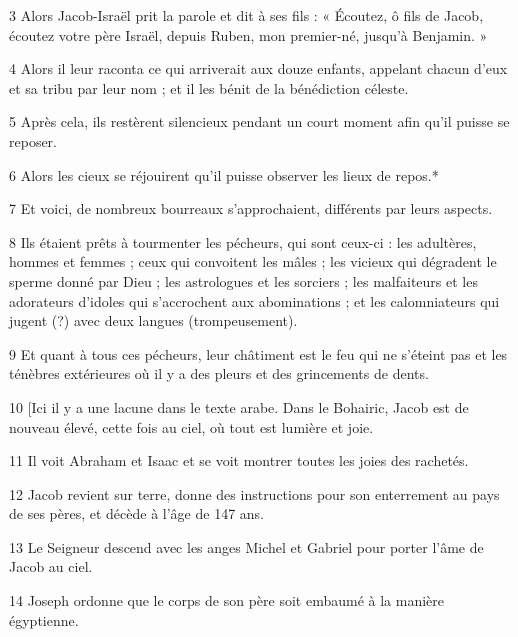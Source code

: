 \par 3 Alors Jacob-Israël prit la parole et dit à ses fils : « Écoutez, ô fils de Jacob, écoutez votre père Israël, depuis Ruben, mon premier-né, jusqu'à Benjamin. »

\par 4 Alors il leur raconta ce qui arriverait aux douze enfants, appelant chacun d'eux et sa tribu par leur nom ; et il les bénit de la bénédiction céleste.

\par 5 Après cela, ils restèrent silencieux pendant un court moment afin qu'il puisse se reposer.

\par 6 Alors les cieux se réjouirent qu'il puisse observer les lieux de repos.*

\par 7 Et voici, de nombreux bourreaux s'approchaient, différents par leurs aspects.

\par 8 Ils étaient prêts à tourmenter les pécheurs, qui sont ceux-ci : les adultères, hommes et femmes ; ceux qui convoitent les mâles ; les vicieux qui dégradent le sperme donné par Dieu ; les astrologues et les sorciers ; les malfaiteurs et les adorateurs d'idoles qui s'accrochent aux abominations ; et les calomniateurs qui jugent (?) avec deux langues (trompeusement).

\par 9 Et quant à tous ces pécheurs, leur châtiment est le feu qui ne s'éteint pas et les ténèbres extérieures où il y a des pleurs et des grincements de dents.

\par 10 [Ici il y a une lacune dans le texte arabe. Dans le Bohairic, Jacob est de nouveau élevé, cette fois au ciel, où tout est lumière et joie.

\par 11 Il voit Abraham et Isaac et se voit montrer toutes les joies des rachetés.

\par 12 Jacob revient sur terre, donne des instructions pour son enterrement au pays de ses pères, et décède à l'âge de 147 ans.

\par 13 Le Seigneur descend avec les anges Michel et Gabriel pour porter l'âme de Jacob au ciel.

\par 14 Joseph ordonne que le corps de son père soit embaumé à la manière égyptienne.

